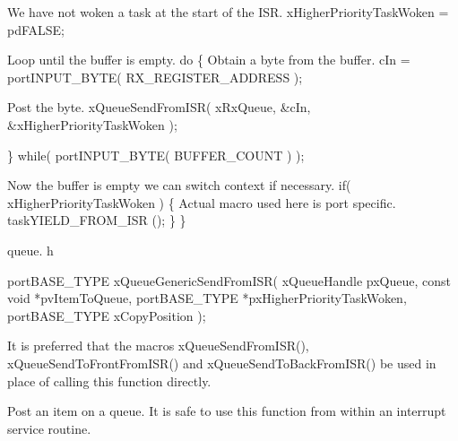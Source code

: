 \begin{DoxyPre}We have not woken a task at the start of the ISR.
        xHigherPriorityTaskWoken = pdFALSE;\end{DoxyPre}



\begin{DoxyPre}Loop until the buffer is empty.
        do
        \{
Obtain a byte from the buffer.
                cIn = portINPUT\_BYTE( RX\_REGISTER\_ADDRESS );\end{DoxyPre}



\begin{DoxyPre}Post the byte.
                xQueueSendFromISR( xRxQueue, &cIn, &xHigherPriorityTaskWoken );\end{DoxyPre}



\begin{DoxyPre}        \} while( portINPUT\_BYTE( BUFFER\_COUNT ) );\end{DoxyPre}



\begin{DoxyPre}Now the buffer is empty we can switch context if necessary.
        if( xHigherPriorityTaskWoken )
        \{
Actual macro used here is port specific.
                taskYIELD\_FROM\_ISR ();
        \}
 \}
 \end{DoxyPre}


queue. h 
\begin{DoxyPre}
 portBASE\_TYPE xQueueGenericSendFromISR(
                                                                                   xQueueHandle pxQueue,
                                                                                   const        void    *pvItemToQueue,
                                                                                   portBASE\_TYPE        *pxHigherPriorityTaskWoken,
                                                                                   portBASE\_TYPE        xCopyPosition
                                                                           );
 \end{DoxyPre}


It is preferred that the macros x\-Queue\-Send\-From\-I\-S\-R(), x\-Queue\-Send\-To\-Front\-From\-I\-S\-R() and x\-Queue\-Send\-To\-Back\-From\-I\-S\-R() be used in place of calling this function directly.

Post an item on a queue. It is safe to use this function from within an interrupt service routine.

